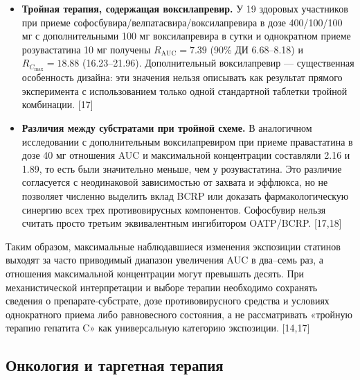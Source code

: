 \documentclass[11pt]{article}
\begin{document}
\begin{itemize}
\item \textbf{Тройная терапия, содержащая воксилапревир.} У 19 здоровых участников при приеме софосбувира/\allowbreak велпатасвира/\allowbreak воксилапревира в дозе 400/100/100 мг с дополнительными 100 мг воксилапревира в сутки и однократном приеме розувастатина 10 мг получены \(R_{\mathrm{AUC}}=7.39\) (90\% ДИ 6.68--8.18) и \(R_{C_{\max}}=18.88\) (16.23--21.96). Дополнительный воксилапревир --- существенная особенность дизайна: эти значения нельзя описывать как результат прямого эксперимента с использованием только одной стандартной таблетки тройной комбинации. [17]
\item \textbf{Различия между субстратами при тройной схеме.} В аналогичном исследовании с дополнительным воксилапревиром при приеме правастатина в дозе 40 мг отношения AUC и максимальной концентрации составляли 2.16 и 1.89, то есть были значительно меньше, чем у розувастатина. Это различие согласуется с неодинаковой зависимостью от захвата и эффлюкса, но не позволяет численно выделить вклад BCRP или доказать фармакологическую синергию всех трех противовирусных компонентов. Софосбувир нельзя считать просто третьим эквивалентным ингибитором OATP/BCRP. [17,18]
\end{itemize}

Таким образом, максимальные наблюдавшиеся изменения экспозиции статинов выходят за часто приводимый диапазон увеличения AUC в два--семь раз, а отношения максимальной концентрации могут превышать десять. При механистической интерпретации и выборе терапии необходимо сохранять сведения о препарате-субстрате, дозе противовирусного средства и условиях однократного приема либо равновесного состояния, а не рассматривать «тройную терапию гепатита C» как универсальную категорию экспозиции. [14,17]

\subsection{Онкология и таргетная терапия}
\end{document}
